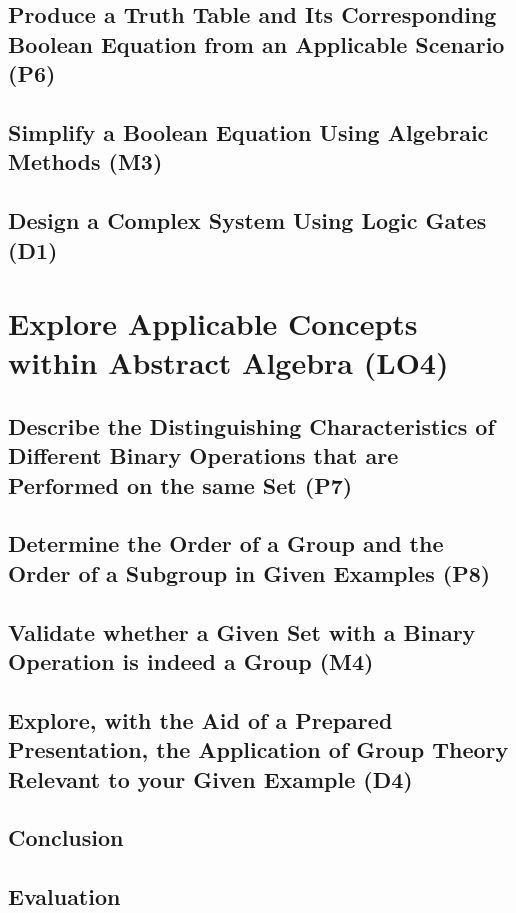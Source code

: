 \documentclass[12pt, a4paper, twoside]{report} %
\begin{document}
\section{Produce a Truth Table and Its Corresponding Boolean Equation from an Applicable Scenario (P6)}
\label{sec:P6}

\section{Simplify a Boolean Equation Using Algebraic Methods (M3)}
\label{sec:M3}

\section{Design a Complex System Using Logic Gates (D1)}
\label{sec:D1}

\chapter{Explore Applicable Concepts within Abstract Algebra (LO4)}
\label{chap:LO4}

\section{Describe the Distinguishing Characteristics of Different Binary Operations that are Performed on the same Set (P7)}
\label{sec:P7}

\section{Determine the Order of a Group and the Order of a Subgroup in Given Examples (P8)}
\label{sec:P8}

\section{Validate whether a Given Set with a Binary Operation is indeed a Group (M4)}
\label{sec:M4}

\section{Explore, with the Aid of a Prepared Presentation, the Application of Group Theory Relevant to your Given Example (D4)}
\label{sec:D4}



\newpage
\section*{Conclusion}
\newpage
\section*{Evaluation}

\end{document}
